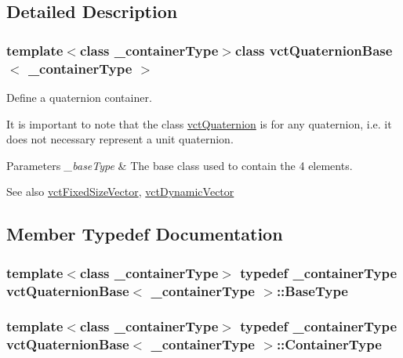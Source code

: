\subsection{Detailed Description}
\subsubsection*{template$<$class \+\_\+container\+Type$>$class vct\+Quaternion\+Base$<$ \+\_\+container\+Type $>$}

Define a quaternion container. 

It is important to note that the class \hyperlink{classvct_quaternion}{vct\+Quaternion} is for any quaternion, i.\+e. it does not necessary represent a unit quaternion.


\begin{DoxyParams}{Parameters}
{\em \+\_\+base\+Type} & The base class used to contain the 4 elements.\\
\hline
\end{DoxyParams}
\begin{DoxySeeAlso}{See also}
\hyperlink{classvct_fixed_size_vector}{vct\+Fixed\+Size\+Vector}, \hyperlink{classvct_dynamic_vector}{vct\+Dynamic\+Vector} 
\end{DoxySeeAlso}


\subsection{Member Typedef Documentation}
\hypertarget{classvct_quaternion_base_a342c9d5a6e43b2e9e5325edcb5ebadbc}{}
\subsubsection[{Base\+Type}]{\setlength{\rightskip}{0pt plus 5cm}template$<$class \+\_\+container\+Type$>$ typedef \+\_\+container\+Type {\bf vct\+Quaternion\+Base}$<$ \+\_\+container\+Type $>$\+::{\bf Base\+Type}}\label{classvct_quaternion_base_a342c9d5a6e43b2e9e5325edcb5ebadbc}
\hypertarget{classvct_quaternion_base_ad9916f63417895bf3ac6ad6cd753cb47}{}
\subsubsection[{Container\+Type}]{\setlength{\rightskip}{0pt plus 5cm}template$<$class \+\_\+container\+Type$>$ typedef \+\_\+container\+Type {\bf vct\+Quaternion\+Base}$<$ \+\_\+container\+Type $>$\+::{\bf Container\+Type}}\label{classvct_quaternion_base_ad9916f63417895bf3ac6ad6cd753cb47}
\hypertarget{classvct_quaternion_base_af28efdc38acf89acb7a67afada11408c}{}
